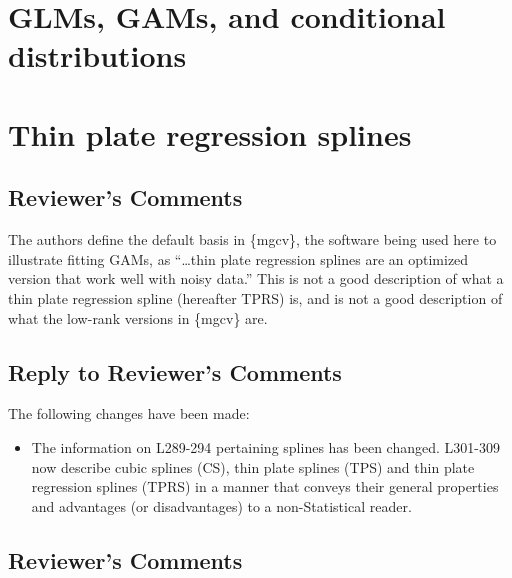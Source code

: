 \documentclass[
]{article}
\providecommand{\tightlist}{%
  \setlength{\itemsep}{0pt}\setlength{\parskip}{0pt}}
\begin{document}
\hypertarget{glms-gams-and-conditional-distributions}{%
\section{GLMs, GAMs, and conditional distributions}\label{glms-gams-and-conditional-distributions}}

\hypertarget{thin-plate-regression-splines}{%
\section{Thin plate regression splines}\label{thin-plate-regression-splines}}

\hypertarget{reviewers-comments-2}{%
\subsection{Reviewer's Comments}\label{reviewers-comments-2}}

The authors define the default basis in \{mgcv\}, the software being used here to illustrate fitting GAMs, as ``\ldots thin plate regression splines are an optimized version that work well with noisy data.'' This is not a good description of what a thin plate regression spline (hereafter TPRS) is, and is not a good description of what the low-rank versions in \{mgcv\} are.

\hypertarget{section-3}{%
\subsection{\texorpdfstring{\textcolor{reviewersblue} {Reply to Reviewer's Comments}}{}}\label{section-3}}

The following changes have been made:

\begin{itemize}
\tightlist
\item
  The information on L289-294 pertaining splines has been changed. L301-309 now describe cubic splines (CS), thin plate splines (TPS) and thin plate regression splines (TPRS) in a manner that conveys their general properties and advantages (or disadvantages) to a non-Statistical reader.
\end{itemize}

\hypertarget{reviewers-comments-3}{%
\subsection{Reviewer's Comments}\label{reviewers-comments-3}}
\end{document}
